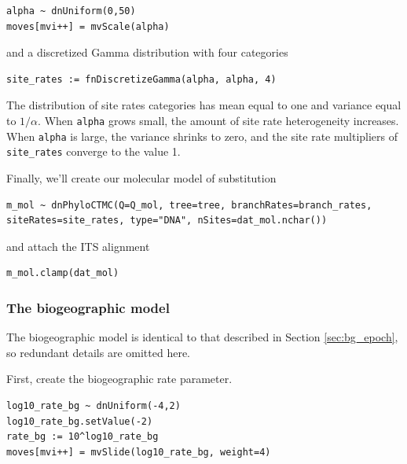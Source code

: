 \begin{snugshade}
\begin{lstlisting}
alpha ~ dnUniform(0,50)
moves[mvi++] = mvScale(alpha)
\end{lstlisting}
\end{snugshade}

and a discretized Gamma distribution with four categories

\begin{snugshade}
\begin{lstlisting}
site_rates := fnDiscretizeGamma(alpha, alpha, 4)
\end{lstlisting}
\end{snugshade}

The distribution of site rates categories has mean equal to one and variance equal to $1/\alpha$.
When {\tt alpha} grows small, the amount of site rate heterogeneity increases.
When {\tt alpha} is large, the variance shrinks to zero, and the site rate multipliers of {\tt site\_rates} converge to the value 1.

Finally, we'll create our molecular model of substitution

\begin{snugshade}
\begin{lstlisting}
m_mol ~ dnPhyloCTMC(Q=Q_mol, tree=tree, branchRates=branch_rates, siteRates=site_rates, type="DNA", nSites=dat_mol.nchar())
\end{lstlisting}
\end{snugshade}

and attach the ITS alignment

\begin{snugshade}
\begin{lstlisting}
m_mol.clamp(dat_mol)
\end{lstlisting}
\end{snugshade}


\subsubsection{The biogeographic model}

The biogeographic model is identical to that described in Section \ref{sec:bg_epoch}, so redundant details are omitted here.

First, create the biogeographic rate parameter.

\begin{snugshade}
\begin{lstlisting}
log10_rate_bg ~ dnUniform(-4,2)
log10_rate_bg.setValue(-2)
rate_bg := 10^log10_rate_bg
moves[mvi++] = mvSlide(log10_rate_bg, weight=4)
\end{lstlisting}
\end{snugshade}


